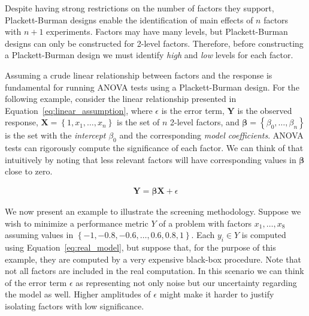 \documentclass[conference]{IEEEtran}
\begin{document}
Despite having strong restrictions on the number of factors they support,
Plackett-Burman designs enable the identification of main effects of \(n\) factors
with \(n + 1\) experiments. Factors may have many levels, but Plackett-Burman
designs can only be constructed for 2-level factors. Therefore, before
constructing a Plackett-Burman design we must identify \emph{high} and \emph{low} levels
for each factor.

Assuming a crude linear relationship between factors and the response is
fundamental for running ANOVA tests using a Plackett-Burman design. For the
following example, consider the linear relationship presented in
Equation~\eqref{eq:linear_assumption}, where \(\epsilon\) is the error term,
\(\mathbf{Y}\) is the observed response, \(\mathbf{X} = \left\{1,
x_1,\dots,x_n\right\}\) is the set of \(n\) 2-level factors, and \(\bm{\beta} =
\left\{\beta_0,\dots,\beta_n\right\}\) is the set with the \emph{intercept} \(\beta_0\)
and the corresponding \emph{model coefficients}. ANOVA tests can rigorously compute
the significance of each factor. We can think of that intuitively by noting that
less relevant factors will have corresponding values in \(\bm{\beta}\) close to
zero.

\vspace{-15pt}

{\normalsize
\begin{align}
\mathbf{Y} = \bm{\beta}\mathbf{X} + \epsilon
\label{eq:linear_assumption}
\end{align}
}

\vspace{-10pt}

We now present an example to illustrate the screening methodology. Suppose we
wish to minimize a performance metric \(Y\) of a problem with factors
\(x_1,\dots,x_8\) assuming values in \(\left\{-1, -0.8, -0.6, \dots, 0.6, 0.8,
1\right\}\). Each \(y_i \in Y\) is computed using
Equation~\eqref{eq:real_model}, but suppose that, for the purpose of this
example, they are computed by a very expensive black-box procedure. Note that
not all factors are included in the real computation. In this scenario we can
think of the error term \(\epsilon\) as representing not only noise but our
uncertainty regarding the model as well. Higher amplitudes of \(\epsilon\) might
make it harder to justify isolating factors with low significance.

\vspace{-10pt}
\end{document}
